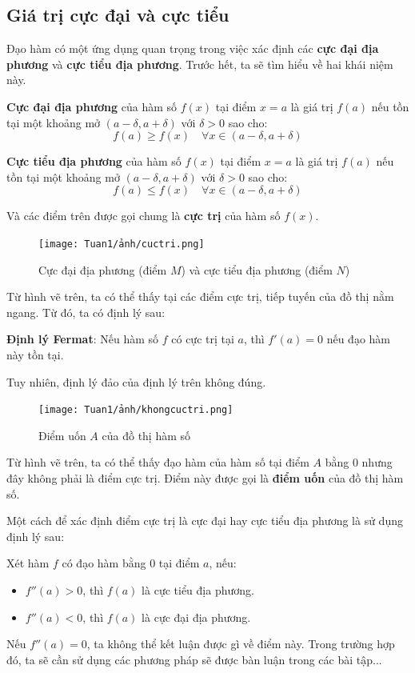 \subsection{Giá trị cực đại và cực tiểu}
Đạo hàm có một ứng dụng quan trọng trong việc xác định các \textbf{cực đại địa phương} và \textbf{cực tiểu địa phương}. Trước hết, ta sẽ tìm hiểu về hai khái niệm này.
\begin{definition}
    \textbf{Cực đại địa phương} của hàm số \(f(x)\) tại điểm \(x=a\) là giá trị \(f(a)\) nếu tồn tại một khoảng mở \((a-\delta, a+\delta)\) với \(\delta > 0\) sao cho:
    \[
    f(a) \geq f(x) \quad \forall x \in (a-\delta, a+\delta)
    \]
\end{definition}
\begin{definition}
    \textbf{Cực tiểu địa phương} của hàm số \(f(x)\) tại điểm \(x=a\) là giá trị \(f(a)\) nếu tồn tại một khoảng mở \((a-\delta, a+\delta)\) với \(\delta > 0\) sao cho:
    \[
    f(a) \leq f(x) \quad \forall x \in (a-\delta, a+\delta)
    \]
\end{definition}
Và các điểm trên được gọi chung là \textbf{cực trị} của hàm số \(f(x)\).
\begin{figure}[H]
\centering
\texttt{[image: Tuan1/ảnh/cuctri.png]}
\caption{Cực đại địa phương (điểm \(M\)) và cực tiểu địa phương (điểm \(N\))}
\end{figure}
Từ hình vẽ trên, ta có thể thấy tại các điểm cực trị, tiếp tuyến của đồ thị nằm ngang. Từ đó, ta có định lý sau:
\begin{theorem}
    \textbf{Định lý Fermat}: Nếu hàm số \(f\) có cực trị tại \(a\), thì \(f'(a)=0\) nếu đạo hàm này tồn tại.
\end{theorem}
Tuy nhiên, định lý đảo của định lý trên không đúng.
\begin{figure}[H]
\centering
\texttt{[image: Tuan1/ảnh/khongcuctri.png]}
\caption{Điểm uốn \(A\) của đồ thị hàm số}
\end{figure}
Từ hình vẽ trên, ta có thể thấy đạo hàm của hàm số tại điểm \(A\) bằng 0 nhưng đây không phải là điểm cực trị. Điểm này được gọi là \textbf{điểm uốn} của đồ thị hàm số.

Một cách để xác định điểm cực trị là cực đại hay cực tiểu địa phương là sử dụng định lý sau:
\begin{theorem}
    Xét hàm \(f\) có đạo hàm bằng 0 tại điểm \(a\), nếu:
    \begin{itemize}
    \item \(f''(a) > 0\), thì \(f(a)\) là cực tiểu địa phương.
    \item \(f''(a) < 0\), thì \(f(a)\) là cực đại địa phương.
    \end{itemize}
\end{theorem}
Nếu \(f''(a) = 0\), ta không thể kết luận được gì về điểm này. Trong trường hợp đó, ta sẽ cần sử dụng các phương pháp sẽ được bàn luận trong các bài tập...


